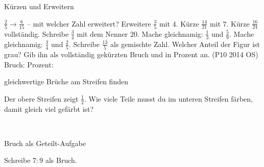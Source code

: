 \setcounter{aufgabe}{13}

\begin{aufgabe}{Kürzen und Erweitern}
\begin{teile}
\teil $\frac{2}{5} \to \frac{6}{15}$ – mit welcher Zahl erweitert?
\teil Erweitere $\frac{3}{5}$ mit $4$.
\teil Kürze $\frac{14}{21}$ mit $7$.
\teil Kürze $\frac{16}{24}$ vollständig.
\teil Schreibe $\frac{3}{4}$ mit dem Nenner $20$.
\teil Mache gleichnamig: $\frac{1}{3}$ und $\frac{5}{9}$.
\teil Mache gleichnamig: $\frac{3}{4}$ und $\frac{2}{5}$.
\teil Schreibe $\frac{13}{5}$ als gemischte Zahl.
\teil Welcher Anteil der Figur ist grau? Gib ihn als vollständig gekürzten Bruch und in Prozent an. \hfill (P10 2014 OS) \\

Bruch: \leerfeld Prozent: \leerfeld[\%]
\end{teile}
\end{aufgabe}

\begin{aufgabe}{gleichwertige Brüche am Streifen finden}
\begin{teile}
\teil Der obere Streifen zeigt $\frac{1}{2}$. Wie viele Teile musst du im unteren Streifen färben, damit gleich viel gefärbt ist?

 \\ 
\end{teile}
\end{aufgabe}

\begin{aufgabe}{Bruch als Geteilt-Aufgabe}
\begin{teile}
\teil Schreibe $7 : 9$ als Bruch.
\end{teile}
\end{aufgabe}

